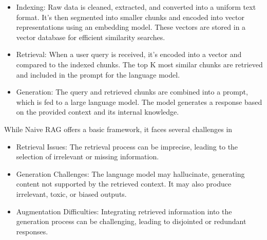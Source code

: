 \begin{itemize}
	\item Indexing: Raw data is cleaned, extracted, and converted into a uniform text format. It's then segmented into smaller chunks and encoded into vector representations using an embedding model. These vectors are stored in a vector database for efficient similarity searches.
	\item Retrieval: When a user query is received, it's encoded into a vector and compared to the indexed chunks. The top K most similar chunks are retrieved and included in the prompt for the language model.
	\item Generation: The query and retrieved chunks are combined into a prompt, which is fed to a large language model. The model generates a response based on the provided context and its internal knowledge.
\end{itemize}
While Naive RAG offers a basic framework, it faces several challenges in 
\begin{itemize}
	\item Retrieval Issues: The retrieval process can be imprecise, leading to the selection of irrelevant or missing information.
	\item Generation Challenges: The language model may hallucinate, generating content not supported by the retrieved context. It may also produce irrelevant, toxic, or biased outputs.
	\item Augmentation Difficulties: Integrating retrieved information into the generation process can be challenging, leading to disjointed or redundant responses.
\end{itemize}

